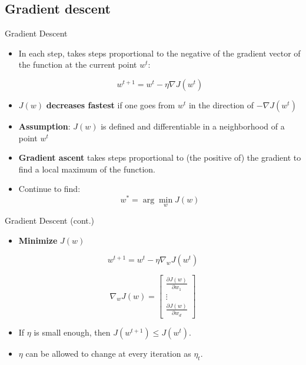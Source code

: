 \documentclass[serif, aspectratio=169]{beamer}
\begin{document}
\subsection{Gradient descent}
\begin{frame}{Gradient Descent}

    \begin{itemize}
        \item In each step, takes steps proportional to the negative of the gradient vector of the function at the current point \( w^t \):
        
        \[
        w^{t+1} = w^t - \eta \nabla J(w^t)
        \]
        
        \item \( J(w) \) \textbf{decreases fastest} if one goes from \( w^t \) in the direction of \( -\nabla J(w^t) \)
        
        \item \textbf{Assumption}: \( J(w) \) is defined and differentiable in a neighborhood of a point \( w^t \)
        
        \item \textbf{Gradient ascent} takes steps proportional to (the positive of) the gradient to find a local maximum of the function.
        
        \item Continue to find:
        \[
        w^* = \arg \min_w J(w)
        \]
    
    \end{itemize}

\end{frame}

\begin{frame}{Gradient Descent (cont.)}

    \begin{itemize}
        \item \textbf{Minimize} \( J(w) \)
    \end{itemize}
    
    \[
    w^{t+1} = w^t - \eta \nabla_w J(w^t)
    \]
    
    \[
    \nabla_w J(w) = 
    \begin{bmatrix}
        \frac{\partial J(w)}{\partial w_1} \\
        \vdots \\
        \frac{\partial J(w)}{\partial w_d}
    \end{bmatrix}
    \]
    
    \begin{itemize}
        \item If \( \eta \) is small enough, then \( J(w^{t+1}) \leq J(w^t) \).
        \item \( \eta \) can be allowed to change at every iteration as \( \eta_t \).
    \end{itemize}

\end{frame}
\end{document}
